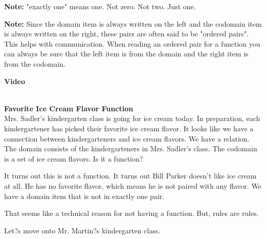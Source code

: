 \documentclass{ximera}
\begin{document}
\begin{observation} 
\textbf{Note:} "exactly one" means one. Not zero. Not two. Just one.
\end{observation}

\begin{observation} 
\textbf{Note:} Since the domain item is always written on the left and the codomain item is always written on the right, these pairs are often said to be "ordered pairs". This helps with communication. When reading an ordered pair for a function you can always be sure that the left item is from the domain and the right item is from the codomain.
\end{observation}


\begin{explanation} \textbf{Video}
\begin{center}
\end{center}
\end{explanation}

\quad \\


\textbf{Favorite Ice Cream Flavor Function} \\

Mrs. Sadler's kindergarten class is going for ice cream today.  In preparation, each kindergartener has picked their favorite ice cream flavor. It looks like we have a connection between kindergarteners and ice cream flavors.  We have a relation.  The domain consists of the kindergarteners in Mrs. Sadler's class.  The codomain is a set of ice cream flavors. Is it a function?

It turns out this is not a function.  It turns out Bill Parker doesn't like ice cream at all. He has no favorite flavor, which means he is not paired with any flavor.  We have a domain item that is not in exactly one pair.

That seems like a technical reason for not having a function.  But, rules are rules.  

Let?s move onto Mr. Martin?s kindergarten class.
\end{document}
